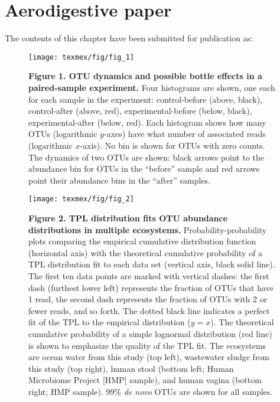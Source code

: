 
\chapter{Aerodigestive paper}

The contents of this chapter have been submitted for publication as: 



\clearpage
\begin{figure}[ht]
\centering
\texttt{[image: texmex/fig/fig\_1]}
\caption*{{\bf Figure 1. OTU dynamics and possible bottle effects in a paired-sample experiment.}
Four histograms are shown, one each for each sample in the experiment:
control-before (above, black), control-after (above, red), experimental-before
(below, black), experimental-after (below, red). Each histogram shows how many
OTUs (logarithmic $y$-axes) have what number of associated reads (logarithmic
$x$-axis). No bin is shown for OTUs with zero counts. The dynamics of two OTUs
are shown: black arrows point to the abundance bin for OTUs in the ``before''
sample and red arrows point their abundance bins in the ``after'' samples.}
\end{figure}

\clearpage
\begin{figure}[ht]
\centering
\texttt{[image: texmex/fig/fig\_2]}
\caption*{{\bf Figure 2. TPL distribution fits OTU abundance distributions in multiple ecosystems.}
Probability-probability plots comparing the empirical cumulative distribution
function (horizontal axis) with the theoretical cumulative probability of a TPL
distribution fit to each data set (vertical axis, black solid line). The first
ten data points are marked with vertical dashes: the first dash (furthest lower
left) represents the fraction of OTUs that have 1 read, the second dash
represents the fraction of OTUs with 2 or fewer reads, and so forth. The dotted
black line indicates a perfect fit of the TPL to the empirical distribution ($y = x$).
The theoretical cumulative probability of a simple lognormal distribution
(red line) is shown to emphasize the quality of the TPL fit. The ecosystems are
ocean water from this study (top left), wastewater sludge from this study (top
right), human stool (bottom left; Human Microbiome Project [HMP] sample), and
human vagina (bottom right; HMP sample). 99\% \textit{de novo} OTUs are shown for all
samples.}
\end{figure}

